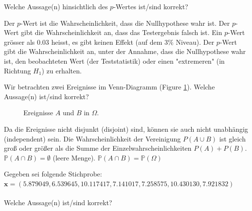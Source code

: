 \documentclass[10pt,addpoints]{exam}
\begin{document}
\begin{questions}
\question Welche Aussage(n) hinsichtlich des $p$-Wertes ist/sind korrekt?\\

\begin{choices}
\choice Der $p$-Wert ist die Wahrscheinlichkeit, dass die Nullhypothese wahr ist.
\choice Der $p$-Wert gibt die Wahrscheinlichkeit an, dass das Testergebnis falsch ist.
\choice Ein $p$-Wert grösser als 0.03 heisst, es gibt keinen Effekt (auf dem 3\% Niveau).
\CorrectChoice Der $p$-Wert gibt die Wahrscheinlichkeit an, unter der Annahme, dass die 
Nullhypothese wahr ist, den beobachteten Wert (der Teststatistik) oder einen "extremeren" (in Richtung $H_1$)
zu erhalten.
\end{choices}

\question Wir betrachten zwei Ereignisse im Venn-Diagramm (Figure \ref{fig:venn_diagram}). 
Welche Aussage(n) ist/sind korrekt?

\begin{figure}[h!]
    \centering
    \caption{Ereignisse \(A\) und \(B\) in \(\Omega\).}
    \label{fig:venn_diagram}
\end{figure}

\begin{choices}
\choice Da die Ereignisse nicht disjunkt (disjoint) sind, können sie auch nicht unabhängig (independent) sein.
\choice Die Wahrscheinlichkeit der Vereinigung $P(A \cup B)$ ist gleich groß oder größer als die Summe der 
Einzelwahrscheinlichkeiten $P(A) + P(B)$.
\choice $\mathbb{P}(A \cap B) = \emptyset$ (leere Menge).
\choice $\mathbb{P}(A \cap B) = \mathbb{P}(\Omega)$
\end{choices}

\question Gegeben sei folgende Stichprobe: $ \mathbf{x} = (5.879049, 6.539645, 10.117417, 7.141017, 7.258575, 10.430130, 7.921832)$\\
\\
Welche Aussage(n) ist/sind korrekt?\\


\end{questions}
\end{document}
